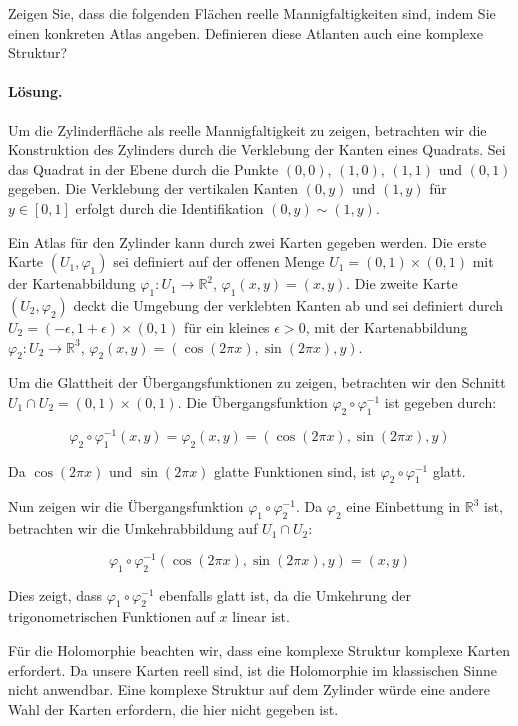 \documentclass[11pt,a4paper]{article}
\begin{document}
Zeigen Sie, dass die folgenden Flächen reelle Mannigfaltigkeiten sind, indem Sie einen konkreten Atlas angeben. Definieren diese Atlanten auch eine komplexe Struktur?

\paragraph{Lösung.}
Um die Zylinderfläche als reelle Mannigfaltigkeit zu zeigen, betrachten wir die Konstruktion des Zylinders durch die Verklebung der Kanten eines Quadrats. Sei das Quadrat in der Ebene durch die Punkte \((0,0)\), \((1,0)\), \((1,1)\) und \((0,1)\) gegeben. Die Verklebung der vertikalen Kanten \((0,y)\) und \((1,y)\) für \(y \in [0,1]\) erfolgt durch die Identifikation \((0,y) \sim (1,y)\).

Ein Atlas für den Zylinder kann durch zwei Karten gegeben werden. Die erste Karte \((U_1, \varphi_1)\) sei definiert auf der offenen Menge \(U_1 = (0,1) \times (0,1)\) mit der Kartenabbildung \(\varphi_1: U_1 \to \mathbb{R}^2\), \(\varphi_1(x,y) = (x,y)\). Die zweite Karte \((U_2, \varphi_2)\) deckt die Umgebung der verklebten Kanten ab und sei definiert durch \(U_2 = (-\epsilon, 1+\epsilon) \times (0,1)\) für ein kleines \(\epsilon > 0\), mit der Kartenabbildung \(\varphi_2: U_2 \to \mathbb{R}^3\), \(\varphi_2(x,y) = (\cos(2\pi x), \sin(2\pi x), y)\).

Um die Glattheit der Übergangsfunktionen zu zeigen, betrachten wir den Schnitt \(U_1 \cap U_2 = (0,1) \times (0,1)\). Die Übergangsfunktion \(\varphi_2 \circ \varphi_1^{-1}\) ist gegeben durch:

\[
\varphi_2 \circ \varphi_1^{-1}(x,y) = \varphi_2(x,y) = (\cos(2\pi x), \sin(2\pi x), y)
\]

Da \(\cos(2\pi x)\) und \(\sin(2\pi x)\) glatte Funktionen sind, ist \(\varphi_2 \circ \varphi_1^{-1}\) glatt.

Nun zeigen wir die Übergangsfunktion \(\varphi_1 \circ \varphi_2^{-1}\). Da \(\varphi_2\) eine Einbettung in \(\mathbb{R}^3\) ist, betrachten wir die Umkehrabbildung auf \(U_1 \cap U_2\):

\[
\varphi_1 \circ \varphi_2^{-1}(\cos(2\pi x), \sin(2\pi x), y) = (x, y)
\]

Dies zeigt, dass \(\varphi_1 \circ \varphi_2^{-1}\) ebenfalls glatt ist, da die Umkehrung der trigonometrischen Funktionen auf \(x\) linear ist.

Für die Holomorphie beachten wir, dass eine komplexe Struktur komplexe Karten erfordert. Da unsere Karten reell sind, ist die Holomorphie im klassischen Sinne nicht anwendbar. Eine komplexe Struktur auf dem Zylinder würde eine andere Wahl der Karten erfordern, die hier nicht gegeben ist.
\end{document}
